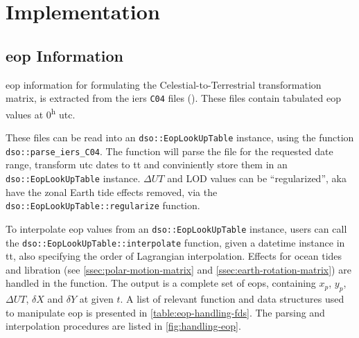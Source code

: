 \section{Implementation}
\label{eop-implementation}

\subsection{\gls{eop} Information}
\label{ssec:eop-information}

\Gls{eop} information for formulating the Celestial-to-Terrestrial transformation 
matrix, is extracted from the \gls{iers} \texttt{C04} files (\cite{Bizouard2019}).
These files contain tabulated \gls{eop} values at 0\textsuperscript{h} \gls{utc}. 

These files can be read into an \texttt{dso::EopLookUpTable} instance, using 
the function \texttt{dso::parse\_iers\_C04}. The function will parse the file 
for the requested date range, transform \gls{utc} dates to \gls{tt} and conviniently 
store them in an \texttt{dso::EopLookUpTable} instance. $\Delta UT$ and LOD values 
can be ``regularized'', aka have the zonal Earth tide effects removed, via the 
\texttt{dso::EopLookUpTable::regularize} function.

To interpolate \gls{eop} values from an \texttt{dso::EopLookUpTable} instance, 
users can call the \texttt{dso::EopLookUpTable::interpolate} function, given 
a datetime instance in \gls{tt}, also specifying the order of Lagrangian 
interpolation. Effects for ocean tides and libration (see \ref{ssec:polar-motion-matrix} 
and \ref{ssec:earth-rotation-matrix}) are handled in the function. The output 
is a complete set of \gls{eop}s, containing $x_p$, $y_p$, $\Delta UT$, $\delta X$ 
and $\delta Y$ at given $t$. A list of relevant function and data structures 
used to manipulate \gls{eop} is presented in \ref{table:eop-handling-fds}. The 
parsing and interpolation procedures are listed in \ref{fig:handling-eop}.

